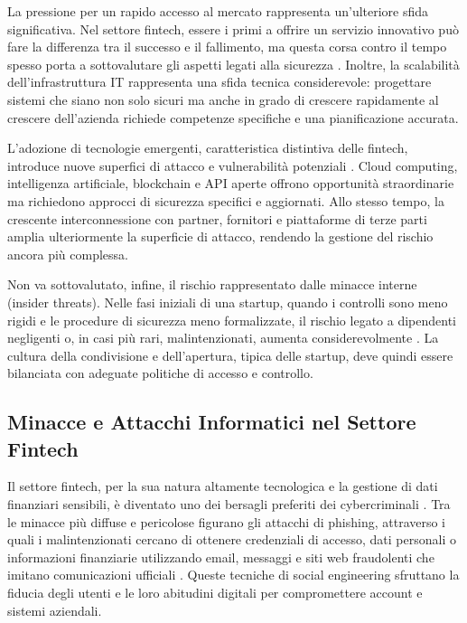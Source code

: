 \documentclass[a4paper,12pt]{report}
\begin{document}
La pressione per un rapido accesso al mercato rappresenta un’ulteriore sfida significativa. Nel settore fintech, essere i primi a offrire un servizio innovativo può fare la differenza tra il successo e il fallimento, ma questa corsa contro il tempo spesso porta a sottovalutare gli aspetti legati alla sicurezza \cite{fintechChallenges}. Inoltre, la scalabilità dell’infrastruttura IT rappresenta una sfida tecnica considerevole: progettare sistemi che siano non solo sicuri ma anche in grado di crescere rapidamente al crescere dell’azienda richiede competenze specifiche e una pianificazione accurata.

L’adozione di tecnologie emergenti, caratteristica distintiva delle fintech, introduce nuove superfici di attacco e vulnerabilità potenziali \cite{fintechChallenges}. Cloud computing, intelligenza artificiale, blockchain e API aperte offrono opportunità straordinarie ma richiedono approcci di sicurezza specifici e aggiornati. Allo stesso tempo, la crescente interconnessione con partner, fornitori e piattaforme di terze parti amplia ulteriormente la superficie di attacco, rendendo la gestione del rischio ancora più complessa.

Non va sottovalutato, infine, il rischio rappresentato dalle minacce interne (insider threats). Nelle fasi iniziali di una startup, quando i controlli sono meno rigidi e le procedure di sicurezza meno formalizzate, il rischio legato a dipendenti negligenti o, in casi più rari, malintenzionati, aumenta considerevolmente \cite{fintechChallenges}. La cultura della condivisione e dell’apertura, tipica delle startup, deve quindi essere bilanciata con adeguate politiche di accesso e controllo.

\subsection*{Minacce e Attacchi Informatici nel Settore Fintech}

Il settore fintech, per la sua natura altamente tecnologica e la gestione di dati finanziari sensibili, è diventato uno dei bersagli preferiti dei cybercriminali \cite{cyberThreatsFintech}. Tra le minacce più diffuse e pericolose figurano gli attacchi di phishing, attraverso i quali i malintenzionati cercano di ottenere credenziali di accesso, dati personali o informazioni finanziarie utilizzando email, messaggi e siti web fraudolenti che imitano comunicazioni ufficiali \cite{cyberThreatsFintech}. Queste tecniche di social engineering sfruttano la fiducia degli utenti e le loro abitudini digitali per compromettere account e sistemi aziendali.
\end{document}
